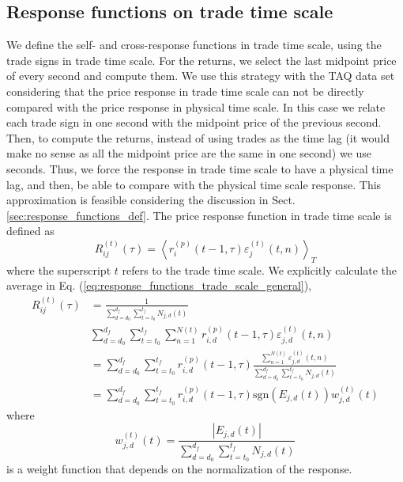 \subsection{Response functions on trade time scale}
\label{subsec:response_function_trade}

We define the self- and cross-response functions in trade time scale, using the
trade signs in trade time scale. For the returns, we select the last midpoint
price of every second and compute them. We use this strategy with the TAQ data
set considering that the price response in trade time scale can not be directly
compared with the price response in physical time scale. In this case we relate
each trade sign in one second with the midpoint price of the previous second.
Then, to compute the returns, instead of using trades as the time lag (it would
make no sense as all the midpoint price are the same in one second) we use
seconds. Thus, we force the response in trade time scale to have a physical
time lag, and then, be able to compare with the physical time scale response.
This approximation is feasible considering the discussion in Sect.
\ref{sec:response_functions_def}. The price response function in trade time
scale is defined as
\begin{equation}\label{eq:response_functions_trade_scale_general}
    R^{\left(t\right)}_{ij}\left(\tau\right)=\left\langle r^{\left(p\right)}
    _{i}\left(t-1,\tau \right)\varepsilon_{j}^{\left(t\right)}
    \left(t, n\right)\right\rangle _{T}
\end{equation}
where the superscript $t$ refers to the trade time scale. We explicitly
calculate the average in Eq. (\ref{eq:response_functions_trade_scale_general}),
\begin{align}\label{eq:response_trades_explicit}
    R_{ij}^{\left(t\right)}\left(\tau\right)&=\frac{1}{\sum_{d=d_{0}}^{d_{f}}
    \sum_{t=t_{0}}^{t_{f}}N_{j,d} \left(t \right)} \nonumber \\
    &\sum_{d=d_{0}}^{d_{f}}\sum_{t=t_{0}}^{t_{f}}\sum_{n=1}
    ^{N\left(t\right)} r^{\left(p\right)}_{i,d}\left(t-1, \tau\right)
    \varepsilon_{j,d}^{\left(t\right)}\left(t,n\right)\\
    &=\sum_{d=d_{0}}^{d_{f}}\sum_{t=t_{0}}^{t_{f}} r^{\left(p\right)}_{i,d}
    \left(t-1,\tau\right) \frac{\sum_{n=1}^{N\left(t\right)}
    \varepsilon_{j,d}^{\left(t\right)}\left(t,n \right)}
    {\sum_{d=d_{0}}^{d_{f}} \sum_{t=t_{0}}^{t_{f}}N_{j,d}\left(t\right)}
    \nonumber \\
    &=\sum_{d=d_{0}}^{d_{f}}\sum_{t=t_{0}}^{t_{f}}r^{\left(p\right)}_{i,d}
    \left(t-1,\tau\right) \text{sgn}\left(E_{j,d}\left(t\right)\right)
    w_{j,d}^{\left(t\right)}\left(t\right)
\end{align}
where
\begin{equation}\label{eq:trade_weight}
    w_{j,d}^{\left(t\right)}\left(t\right) =
    \frac{\left|E_{j,d}\left(t\right)\right|}{\sum_{d=d_{0}}^{d_{f}}
    \sum_{t=t_{0}}^{t_{f}}N_{j,d} \left(t\right)}
\end{equation}
is a weight function that depends on the normalization of the response.

